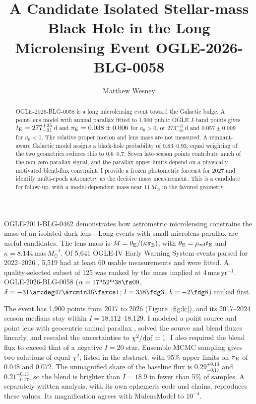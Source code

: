 \documentclass{aastex701}
\begin{document}
\title{A Candidate Isolated Stellar-mass Black Hole in the Long Microlensing Event OGLE-2026-BLG-0058}

\author[0000-0000-0000-0000]{Matthew Wesney} %

\begin{abstract}
OGLE-2026-BLG-0058 is a long microlensing event toward the Galactic bulge. A point-lens model with annual parallax fitted to 1,900 public OGLE $I$-band points gives $t_{\rm E}=277^{+35}_{-31}$\,d and $\pi_{\rm E}=0.038\pm0.006$ for $u_0>0$, or $273^{+33}_{-30}$\,d and $0.057\pm0.009$ for $u_0<0$. The relative proper motion and lens mass are not measured. A remnant-aware Galactic model assigns a black-hole probability of 0.83--0.93; equal weighting of the two geometries reduces this to 0.6--0.7. Seven late-season points contribute much of the non-zero-parallax signal, and the parallax upper limits depend on a physically motivated blend-flux constraint. I provide a frozen photometric forecast for 2027 and identify multi-epoch astrometry as the decisive mass measurement. This is a candidate for follow-up, with a model-dependent mass near $11\,M_\odot$ in the favored geometry.
\end{abstract}


OGLE-2011-BLG-0462 demonstrates how astrometric microlensing constrains the mass of an isolated dark lens \citep{2022ApJ...933...83S,2022ApJ...933L..23L}. Long events with small microlens parallax are useful candidates. The lens mass is $M=\theta_{\rm E}/(\kappa\pi_{\rm E})$, with $\theta_{\rm E}=\mu_{\rm rel}t_{\rm E}$ and $\kappa=8.144$\,mas\,$M_\odot^{-1}$. Of 5,641 OGLE-IV Early Warning System events parsed for 2022--2026 \citep{2015AcA....65....1U}, 5,519 had at least 60 usable measurements and were fitted. A quality-selected subset of 125 was ranked by the mass implied at 4\,mas\,yr$^{-1}$. OGLE-2026-BLG-0058 ($\alpha=17^{\rm h}52^{\rm m}38\fs09$, $\delta=-31\arcdeg47\arcmin36\farcs1$; $l=358\fdg3$, $b=-2\fdg8$) ranked first.

The event has 1,900 points from 2017 to 2026 (Figure~\ref{fig:lc}), and its 2017--2024 season medians stay within $I=18.112$--18.129. I modeled a point source and point lens with geocentric annual parallax \citep{2004ApJ...606..319G}, solved the source and blend fluxes linearly, and rescaled the uncertainties to $\chi^2/{\rm dof}=1$. I also required the blend flux to exceed that of a negative $I=20$ star. Ensemble MCMC sampling \citep{2013PASP..125..306F} gives two solutions of equal $\chi^2$, listed in the abstract, with 95\% upper limits on $\pi_{\rm E}$ of 0.048 and 0.072. The unmagnified share of the baseline flux is $0.29^{+0.13}_{-0.17}$ and $0.21^{+0.13}_{-0.17}$, so the blend is brighter than $I=18.9$ in fewer than 5\% of samples. A separately written analysis, with its own ephemeris code and chains, reproduces these values. Its magnification agrees with MulensModel \citep{2019A&C....26...35P} to $10^{-4}$.
\end{document}
